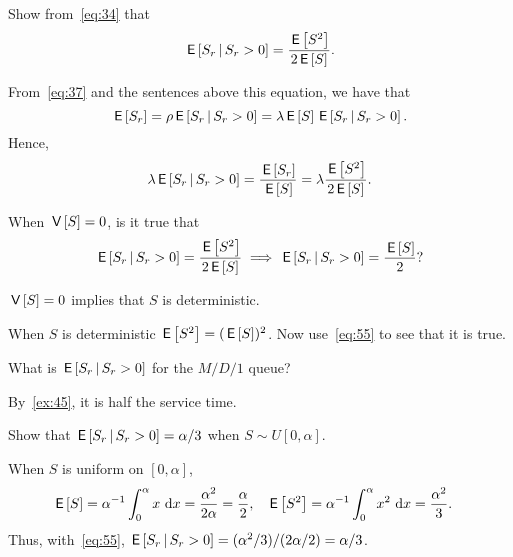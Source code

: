 \documentclass[companion]{subfiles}
\begin{document}
\begin{exercise} 
Show from~\cref{eq:34} that 
\begin{equation}\label{eq:55}
\,\mathsf{E}\left[S_r\,\middle|\, S_r>0\right] = \frac{\,\mathsf{E}\left[S^2\right]}{2 \,\mathsf{E}\left[S\right]}.
\end{equation}
\begin{solution}
 From~\cref{eq:37} and the sentences above this equation,
 we have that
 \begin{equation*}
 \,\mathsf{E}\left[S_r\right] = \rho \,\mathsf{E}\left[S_r\,\middle|\, S_r>0\right]=\lambda \,\mathsf{E}\left[S\right] \,\mathsf{E}\left[S_r\,\middle|\, S_r>0\right].
 \end{equation*}
Hence,
 \begin{equation*}
 \lambda \,\mathsf{E}\left[S_r\,\middle|\, S_r>0\right] = \frac{\,\mathsf{E}\left[S_r\right]}{\,\mathsf{E}\left[S\right]} = \lambda \frac{\,\mathsf{E}\left[S^2\right]}{2 \,\mathsf{E}\left[S\right]}.
 \end{equation*}
\end{solution}
\end{exercise}


\begin{extra}
When $\,\mathsf{V}\left[S\right] = 0$, is it true that
\begin{equation*}
\,\mathsf{E}\left[S_r\,\middle|\, S_r>0\right] = \frac{\,\mathsf{E}\left[S^2\right]}{2 \,\mathsf{E}\left[S\right]} \implies \,\mathsf{E}\left[S_r\,\middle|\, S_r>0\right] = \frac{\,\mathsf{E}\left[S\right]} 2?
\end{equation*}
\begin{hint}
 $\,\mathsf{V}\left[S\right] = 0$ implies that $S$ is deterministic.
\end{hint}
\begin{solution}
 When $S$ is deterministic $\,\mathsf{E}\left[S^2\right] = (\,\mathsf{E}\left[S\right])^2$. Now use~\cref{eq:55} to see that it is true.
\end{solution}
\end{extra}

\begin{extra}
 What is $\,\mathsf{E}\left[S_r\,\middle|\, S_r>0\right]$ for the $M/D/1$ queue? 
\begin{solution}
By~\cref{ex:45}, it is half the service time. 
\end{solution}
\end{extra}

\begin{extra}
Show that $\,\mathsf{E}\left[S_r\,\middle|\, S_r>0\right] = \alpha/3$ when $S \sim U[0, \alpha]$.
\begin{solution}
 When $S$ is uniform on $[0, \alpha]$,
 \begin{align*}
 \,\mathsf{E}\left[S\right] &= \alpha^{-1}\int_0^\alpha x \, \,\text{d}x =\frac{\alpha^2}{2 \alpha} = \frac{\alpha}2, 
&
\,\mathsf{E}\left[S^2\right] &= \alpha^{-1}\int_0^\alpha x^2 \, \,\text{d}x = \frac{\alpha^2}3. 
 \end{align*}
 Thus, with~\cref{eq:55}, $\,\mathsf{E}\left[S_r\,\middle|\, S_r>0\right] = (\alpha^2/3)/(2 \alpha/2) = \alpha/3$. 
\end{solution}
\end{extra}
\end{document}
